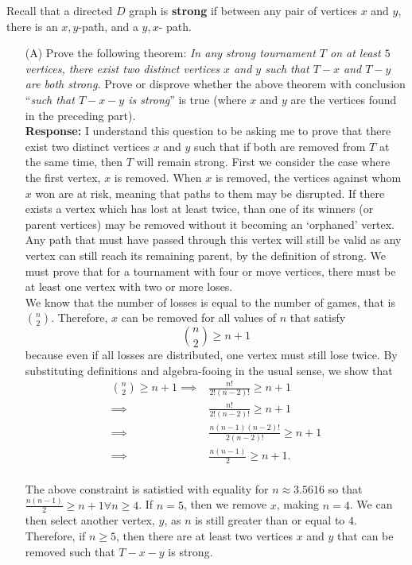 \documentclass{article}
\newcommand{\response}[1]{\leavevmode\\[0.05in]{\bf Response: } #1 \leavevmode\\[0.05in]}
\begin{document}
  Recall that a directed $D$ graph is {\bf strong} if between any pair of vertices $x$ and $y$, there is an $x,y$-path, and a $y,x$- path.  
\begin{enumerate} 
	\item[(A)] Prove the following theorem:  \emph{In any strong tournament $T$ on at least $5$ vertices, there exist two distinct vertices $x$ and $y$ such that $T-x$ and $T-y$ are both strong.} Prove or disprove whether the above theorem with conclusion ``\emph{such that $T - x - y$ is strong}'' is true (where $x$ and $y$ are the vertices found in the preceding part). 
		\response{I understand this question to be asking me to prove that there exist two distinct vertices $x$ and $y$ such that if both are removed from $T$ at the same time, then $T$ will remain strong. First we consider the case where the first vertex, $x$ is removed. When $x$ is removed, the vertices against whom $x$ won are at risk, meaning that paths to them may be disrupted. If there exists a vertex which has lost at least twice, than one of its winners (or parent vertices) may be removed without it becoming an `orphaned' vertex.  Any path that must have passed through this vertex will still be valid as any vertex can still reach its remaining parent, by the definition of strong. We must prove that for a tournament with four or move vertices, there must be at least one vertex with two or more loses. \\[1em]
		We know that the number of losses is equal to the number of games, that is ${n \choose 2}$.  Therefore, $x$ can be removed for all values of $n$ that satisfy
		\begin{equation*}
			{n \choose 2} \ge n + 1
		\end{equation*}
		because even if all losses are distributed, one vertex must still lose twice. By substituting definitions and algebra-fooing in the usual sense, we show that
		\begin{equation*}\begin{aligned}
			{n \choose 2} \ge n + 1 \implies &\frac{n!}{2!(n - 2)!} \ge n + 1 \\	
						\implies &\frac{n!}{2!(n - 2)!} \ge n + 1 \\	
						\implies & \frac{n(n-1)(n-2)!}{2(n-2)!} \ge n + 1 \\
						\implies & \frac{n(n-1)}{2} \ge n + 1.
		\end{aligned}\end{equation*}}
		The above constraint is satistied with equality for $n \approx 3.5616$ so that $\frac{n(n-1)}{2} \ge n + 1 \forall n \ge 4$.  If $n = 5$, then we remove $x$, making $n = 4$. We can then select another vertex, $y$, as $n$ is still greater than or equal to $4$. Therefore, if $n \ge 5$, then there are at least two vertices $x$ and $y$ that can be removed such that $T - x - y$ is strong.

\end{enumerate}
\end{document}
